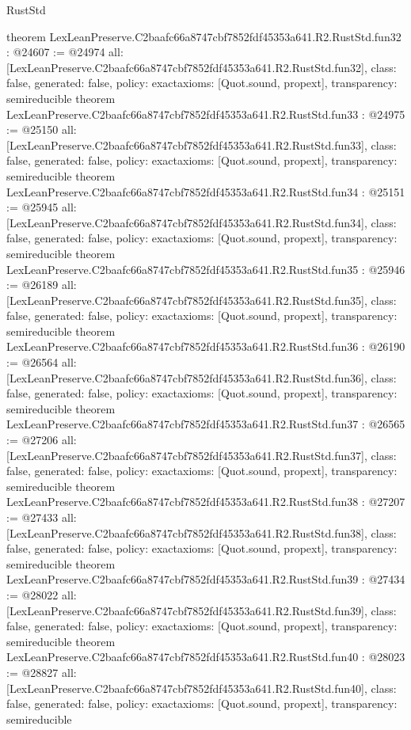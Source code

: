\begin{lexlean}{RustStd}
\begin{coremodule}
{}
theorem LexLeanPreserve.C2baafc66a8747cbf7852fdf45353a641.R2.RustStd.fun32 : @24607 := @24974 {
  all: [LexLeanPreserve.C2baafc66a8747cbf7852fdf45353a641.R2.RustStd.fun32],
  class: false,
  generated: false,
  policy: exact{axioms: [Quot.sound, propext]},
  transparency: semireducible
}
theorem LexLeanPreserve.C2baafc66a8747cbf7852fdf45353a641.R2.RustStd.fun33 : @24975 := @25150 {
  all: [LexLeanPreserve.C2baafc66a8747cbf7852fdf45353a641.R2.RustStd.fun33],
  class: false,
  generated: false,
  policy: exact{axioms: [Quot.sound, propext]},
  transparency: semireducible
}
theorem LexLeanPreserve.C2baafc66a8747cbf7852fdf45353a641.R2.RustStd.fun34 : @25151 := @25945 {
  all: [LexLeanPreserve.C2baafc66a8747cbf7852fdf45353a641.R2.RustStd.fun34],
  class: false,
  generated: false,
  policy: exact{axioms: [Quot.sound, propext]},
  transparency: semireducible
}
theorem LexLeanPreserve.C2baafc66a8747cbf7852fdf45353a641.R2.RustStd.fun35 : @25946 := @26189 {
  all: [LexLeanPreserve.C2baafc66a8747cbf7852fdf45353a641.R2.RustStd.fun35],
  class: false,
  generated: false,
  policy: exact{axioms: [Quot.sound, propext]},
  transparency: semireducible
}
theorem LexLeanPreserve.C2baafc66a8747cbf7852fdf45353a641.R2.RustStd.fun36 : @26190 := @26564 {
  all: [LexLeanPreserve.C2baafc66a8747cbf7852fdf45353a641.R2.RustStd.fun36],
  class: false,
  generated: false,
  policy: exact{axioms: [Quot.sound, propext]},
  transparency: semireducible
}
theorem LexLeanPreserve.C2baafc66a8747cbf7852fdf45353a641.R2.RustStd.fun37 : @26565 := @27206 {
  all: [LexLeanPreserve.C2baafc66a8747cbf7852fdf45353a641.R2.RustStd.fun37],
  class: false,
  generated: false,
  policy: exact{axioms: [Quot.sound, propext]},
  transparency: semireducible
}
theorem LexLeanPreserve.C2baafc66a8747cbf7852fdf45353a641.R2.RustStd.fun38 : @27207 := @27433 {
  all: [LexLeanPreserve.C2baafc66a8747cbf7852fdf45353a641.R2.RustStd.fun38],
  class: false,
  generated: false,
  policy: exact{axioms: [Quot.sound, propext]},
  transparency: semireducible
}
theorem LexLeanPreserve.C2baafc66a8747cbf7852fdf45353a641.R2.RustStd.fun39 : @27434 := @28022 {
  all: [LexLeanPreserve.C2baafc66a8747cbf7852fdf45353a641.R2.RustStd.fun39],
  class: false,
  generated: false,
  policy: exact{axioms: [Quot.sound, propext]},
  transparency: semireducible
}
theorem LexLeanPreserve.C2baafc66a8747cbf7852fdf45353a641.R2.RustStd.fun40 : @28023 := @28827 {
  all: [LexLeanPreserve.C2baafc66a8747cbf7852fdf45353a641.R2.RustStd.fun40],
  class: false,
  generated: false,
  policy: exact{axioms: [Quot.sound, propext]},
  transparency: semireducible
}
\end{coremodule}
\end{lexlean}
